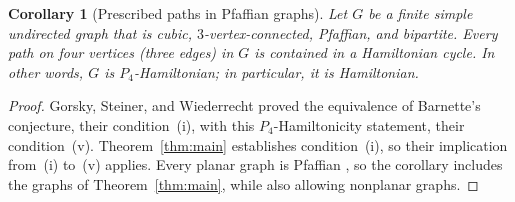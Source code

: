 \documentclass[11pt]{article}
\newtheorem{corollary}[theorem]{Corollary}
\theoremstyle{remark}
\numberwithin{equation}{section}
\begin{document}
\begin{corollary}[Prescribed paths in Pfaffian graphs]\label{cor:pfaffian-paths}
Let \(G\) be a finite simple undirected graph that is cubic,
\(3\)-vertex-connected, Pfaffian, and bipartite. Every path on four
vertices (three edges) in \(G\) is contained in a Hamiltonian cycle.
In other words, \(G\) is \(P_4\)-Hamiltonian; in particular, it is
Hamiltonian.
\end{corollary}

\begin{proof}
Gorsky, Steiner, and Wiederrecht \cite[Theorem~4.16]{GSW2023} proved
the equivalence of Barnette's conjecture, their condition~(i), with
this \(P_4\)-Hamiltonicity statement, their condition~(v).
Theorem~\ref{thm:main} establishes condition~(i), so their implication
from~(i) to~(v) applies. Every planar graph is Pfaffian
\cite[Theorem~4.6]{GSW2023}, so the corollary includes the graphs of
Theorem~\ref{thm:main}, while also allowing nonplanar graphs.
\end{proof}

\begingroup
\small
\setlength{\bibsep}{3pt}


\endgroup
\end{document}
